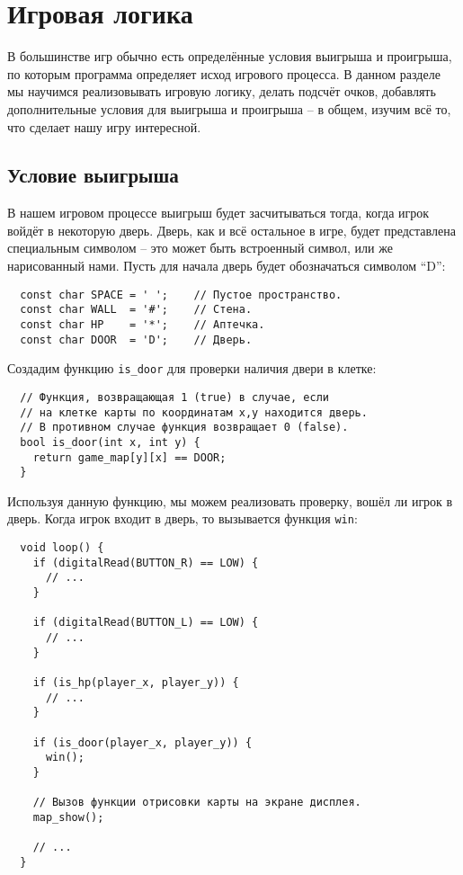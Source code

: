 \documentclass[../sparc.tex]{subfiles}
\begin{document}
\section{Игровая логика}

В большинстве игр обычно есть определённые условия выигрыша и проигрыша, по
которым программа определяет исход игрового процесса.  В данном разделе мы
научимся реализовывать игровую логику, делать подсчёт очков, добавлять
дополнительные условия для выигрыша и проигрыша -- в общем, изучим всё то, что
сделает нашу игру интересной.

\subsection{Условие выигрыша}

В нашем игровом процессе выигрыш будет засчитываться тогда, когда игрок войдёт в
некоторую дверь.  Дверь, как и всё остальное в игре, будет представлена
специальным символом -- это может быть встроенный символ, или же нарисованный
нами.  Пусть для начала дверь будет обозначаться символом ``D'':

\begin{verbatim}
  const char SPACE = ' ';    // Пустое пространство.
  const char WALL  = '#';    // Стена.
  const char HP    = '*';    // Аптечка.
  const char DOOR  = 'D';    // Дверь.
\end{verbatim}

Создадим функцию \texttt{is\_door} для проверки наличия двери в клетке:

\begin{verbatim}
  // Функция, возвращающая 1 (true) в случае, если
  // на клетке карты по координатам x,y находится дверь.
  // В противном случае функция возвращает 0 (false).
  bool is_door(int x, int y) {
    return game_map[y][x] == DOOR;
  }
\end{verbatim}

Используя данную функцию, мы можем реализовать проверку, вошёл ли игрок в дверь.
Когда игрок входит в дверь, то вызывается функция \texttt{win}:

\begin{verbatim}
  void loop() {
    if (digitalRead(BUTTON_R) == LOW) {
      // ...
    }

    if (digitalRead(BUTTON_L) == LOW) {
      // ...
    }

    if (is_hp(player_x, player_y)) {
      // ...
    }

    if (is_door(player_x, player_y)) {
      win();
    }

    // Вызов функции отрисовки карты на экране дисплея.
    map_show();

    // ...
  }
\end{verbatim}
\end{document}
